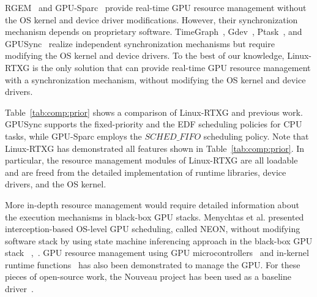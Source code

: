 \label{sec:relatedwork}
\begin{table*}[t]
\begin{center}
\caption{Linux-RTXG vs Prior Work}
\label{tab:comp:prior}
\ifthesis
{}
\fi
\end{center}
\vspace{-4mm}
\end{table*}

RGEM~\cite{kato:rgem} and GPU-Sparc~\cite{sparc} provide real-time GPU resource management without the OS kernel and device driver modifications.
However, their synchronization mechanism depends on proprietary software.
TimeGraph~\cite{kato:timegraph}, Gdev~\cite{kato:gdev}, Ptask~\cite{ptask}, and GPUSync~\cite{elliott:gpusync13} realize independent synchronization mechanisms but require modifying the OS kernel and device drivers.
To the best of our knowledge, Linux-RTXG is the only solution that can provide real-time GPU resource management with a synchronization mechanism, without modifying the OS kernel and device drivers.

Table~\ref{tab:comp:prior} shows a comparison of Linux-RTXG and previous work.
GPUSync supports the fixed-priority and the EDF scheduling policies for CPU tasks, while GPU-Sparc employs the $SCHED\_FIFO$ scheduling policy.
Note that Linux-RTXG has demonstrated all features shown in Table~\ref{tab:comp:prior}.
In particular, the resource management modules of Linux-RTXG are all loadable and are freed from the detailed implementation of runtime libraries, device drivers, and the OS kernel.

More in-depth resource management would require detailed information about the execution mechanisms in black-box GPU stacks. Menychtas et al. presented interception-based OS-level GPU scheduling, called NEON, without modifying software stack by using state machine inferencing approach in the black-box GPU stack ~\cite{menychtas2013enabling},~\cite{neon}. 
GPU resource management using GPU microcontrollers~\cite{fujii:apsys2013} and in-kernel runtime functions~\cite{kato:gdev} has also been demonstrated to manage the GPU.
For these pieces of open-source work, the Nouveau project has been used as a baseline driver~\cite{nouveau}.
